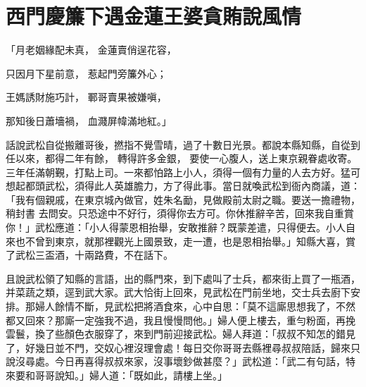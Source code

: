 %

\chapter{西門慶簾下遇金蓮\KG 王婆貪賄說風情}

\begin{showcontents}{}



「月老姻緣配未真，  金蓮賣俏逞花容，

只因月下星前意，  惹起門旁簾外心；

王媽誘財施巧計，  鄆哥賣果被嫌嗔，

那知後日蕭墻禍，  血濺屏幃滿地紅。」

話說武松自從搬離哥後，撚指不覺雪晴，過了十數日光景。都說本縣知縣，自從到任以來，都得二年有餘，
轉得許多金銀，
要使一心腹人，送上東京親眷處收寄。三年任滿朝覲，打點上司。一來都怕路上小人，須得一個有力量的人去方好。猛可想起都頭武松，須得此人英雄膽力，方了得此事。當日就喚武松到衙內商議，道：「我有個親戚，在東京城內做官，姓朱名勔，見做殿前太尉之職。要送一擔禮物，
稍封書
去問安。只恐途中不好行，須得你去方可。你休推辭辛苦，回來我自重賞你！」武松應道：「小人得蒙恩相抬舉，安敢推辭？既蒙差遣，只得便去。小人自來也不曾到東京，就那裡觀光上國景致，走一遭，也是恩相抬舉。」知縣大喜，賞了武松三盃酒，十兩路費，不在話下。

且說武松領了知縣的言語，出的縣門來，到下處叫了士兵，都來街上買了一瓶酒，并菜蔬之類，逕到武大家。武大恰街上回來，見武松在門前坐地，交士兵去廚下安排。那婦人餘情不斷，見武松把將酒食來，心中自思：「莫不這廝思想我了，不然都又回來？那廝一定強我不過，我且慢慢問他。」婦人便上樓去，重勻粉面，再挽雲鬟，換了些顏色衣服穿了，來到門前迎接武松。婦人拜道：「叔叔不知怎的錯見了，好幾日並不門，交奴心裡沒理會處！每日交你哥哥去縣裡尋叔叔陪話，歸來只說沒尋處。今日再喜得叔叔來家，沒事壞鈔做甚麼？」武松道：「武二有句話，特來要和哥哥說知。」婦人道：「既如此，請樓上坐。」


\end{showcontents}
